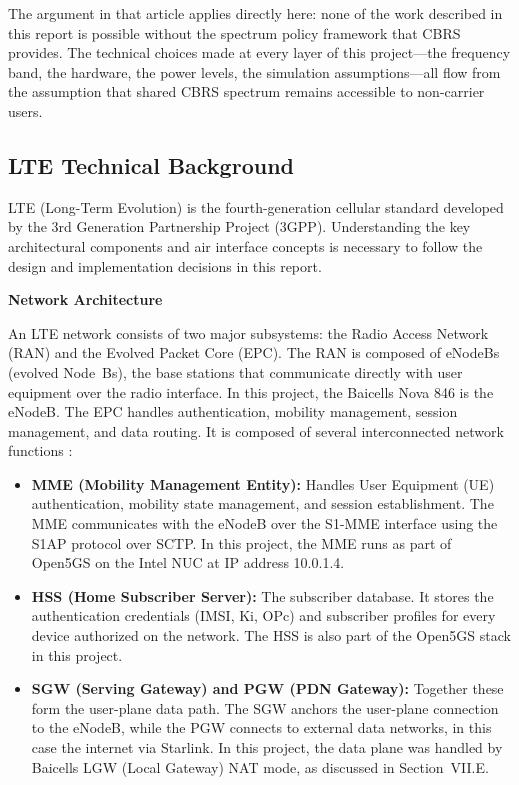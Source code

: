 \documentclass[
    left=1.5in,
    right=1.25in,
    top=1.25in,
    bottom=1.25in
]{CalPolySeniorProject}
\begin{document}
The argument in that article applies directly here: none of the work described
in this report is possible without the spectrum policy framework that CBRS
provides. The technical choices made at every layer of this project---the
frequency band, the hardware, the power levels, the simulation
assumptions---all flow from the assumption that shared CBRS spectrum remains
accessible to non-carrier users.

\subsection{LTE Technical Background}

LTE (Long-Term Evolution) is the fourth-generation cellular standard developed
by the 3rd Generation Partnership Project (3GPP). Understanding the key
architectural components and air interface concepts is necessary to follow the
design and implementation decisions in this report.

\textbf{Network Architecture}

An LTE network consists of two major subsystems: the Radio Access Network (RAN)
and the Evolved Packet Core (EPC). The RAN is composed of eNodeBs (evolved
Node~Bs), the base stations that communicate directly with user equipment over
the radio interface. In this project, the Baicells Nova 846 is the eNodeB. The
EPC handles authentication, mobility management, session management, and data
routing. It is composed of several interconnected network
functions \autocite{hpe2019cbrsradio,hpe2019cbrssignaling}:

\begin{itemize}
    \item \textbf{MME (Mobility Management Entity):} Handles User Equipment
    (UE) authentication, mobility state management, and session establishment.
    The MME communicates with the eNodeB over the S1-MME interface using the
    S1AP protocol over SCTP. In this project, the MME runs as part of Open5GS
    on the Intel NUC at IP address 10.0.1.4.

    \item \textbf{HSS (Home Subscriber Server):} The subscriber database. It
    stores the authentication credentials (IMSI, Ki, OPc) and subscriber
    profiles for every device authorized on the network. The HSS is also part
    of the Open5GS stack in this project.

    \item \textbf{SGW (Serving Gateway) and PGW (PDN Gateway):} Together these
    form the user-plane data path. The SGW anchors the user-plane connection to
    the eNodeB, while the PGW connects to external data networks, in this case
    the internet via Starlink. In this project, the data plane was handled by
    Baicells LGW (Local Gateway) NAT mode, as discussed in Section~VII.E.
\end{itemize}
\end{document}
